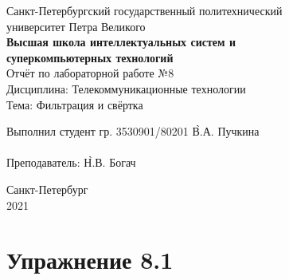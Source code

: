 \documentclass[a4paper, 14pt]{extarticle}
\begin{document}
    \begin{center}
        \begin{center}
            \hfill \break
            \normalsize{Санкт-Петербургский государственный политехнический}\\
            \normalsize{университет Петра Великого}\\
            \hfill \break
            \normalsize{\textbf{Высшая школа интеллектуальных систем и}}\\
            \normalsize{\textbf{суперкомпьютерных технологий}}\\
            \hfill \break
            \hfill \break
            \hfill \break
            \hfill \break
            \hfill \break
            \normalsize{Отчёт по лабораторной работе №8}\\
            \normalsize{Дисциплина: Телекоммуникационные технологии}\\
            \normalsize{Тема: Фильтрация и свёртка}\\
        \end{center}
        \hfill \break
        \hfill \break
        \hfill \break
        \hfill \break
        \hfill \break
        \hfill \break
        \hfill \break
        \hfill \break
        \hfill \break
        \hfill \break
        \begin{tabbing}
            Выполнил студент гр. 3530901/80201 \`В.А. Пучкина\\
            \\
            Преподаватель: \`Н.В. Богач\\
        \end{tabbing}
        \hfill \break
        \hfill \break
        \hfill \break
        \hfill \break
        \begin{center}
            Санкт-Петербург\\
            2021
        \end{center}
        \thispagestyle{empty}
    \end{center}

    \newpage
    \tableofcontents

    \newpage
    \listoffigures

    \newpage
    \lstlistoflistings

    \newpage
    \section{Упражнение 8.1}
    \label{sec:task1}
\end{document}
